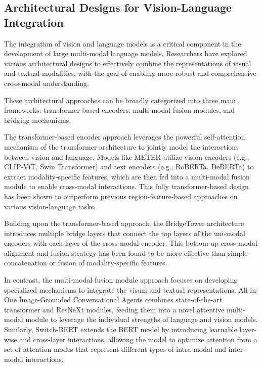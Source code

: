\documentclass[11pt]{article}
\begin{document}
\subsection{Architectural Designs for Vision-Language Integration}

The integration of vision and language models is a critical component in the development of large multi-modal language models. Researchers have explored various architectural designs to effectively combine the representations of visual and textual modalities, with the goal of enabling more robust and comprehensive cross-modal understanding.

These architectural approaches can be broadly categorized into three main frameworks: transformer-based encoders, multi-modal fusion modules, and bridging mechanisms.

The transformer-based encoder approach leverages the powerful self-attention mechanism of the transformer architecture to jointly model the interactions between vision and language. Models like METER \cite{ref112} utilize vision encoders (e.g., CLIP-ViT, Swin Transformer) and text encoders (e.g., RoBERTa, DeBERTa) to extract modality-specific features, which are then fed into a multi-modal fusion module to enable cross-modal interactions. This fully transformer-based design has been shown to outperform previous region-feature-based approaches on various vision-language tasks.

Building upon the transformer-based approach, the BridgeTower architecture \cite{ref113} introduces multiple bridge layers that connect the top layers of the uni-modal encoders with each layer of the cross-modal encoder. This bottom-up cross-modal alignment and fusion strategy has been found to be more effective than simple concatenation or fusion of modality-specific features.

In contrast, the multi-modal fusion module approach focuses on developing specialized mechanisms to integrate the visual and textual representations. All-in-One Image-Grounded Conversational Agents \cite{ref114} combines state-of-the-art transformer and ResNeXt modules, feeding them into a novel attentive multi-modal module to leverage the individual strengths of language and vision models. Similarly, Switch-BERT \cite{ref25} extends the BERT model by introducing learnable layer-wise and cross-layer interactions, allowing the model to optimize attention from a set of attention modes that represent different types of intra-modal and inter-modal interactions.
\end{document}
